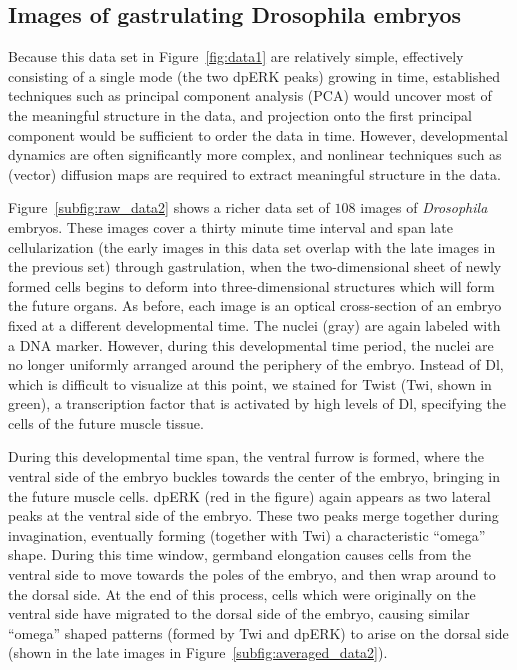\documentclass{pnastwo}
\begin{document}
\begin{article}
%

\subsection{Images of gastrulating  {\subsectionitfont Drosophila} embryos}

%
Because this data set in Figure~\ref{fig:data1} are relatively simple, effectively consisting of a single mode (the two dpERK peaks) growing in time,
established techniques such as principal component analysis (PCA) \cite{shlens2005tutorial} would uncover most of the meaningful structure in the data, and projection onto the first principal component would be sufficient to order the data in time.
%
However, developmental dynamics are often significantly more complex, and nonlinear techniques such as (vector) diffusion maps are required to extract meaningful structure in the data.
%

Figure~\ref{subfig:raw_data2} shows a richer data set of $108$ images of {\it Drosophila} embryos.
%
These images cover a thirty minute time interval and span late cellularization (the early images in this data set overlap with the late images in the previous set) through gastrulation, when the two-dimensional sheet of newly formed cells begins to deform into three-dimensional structures which will form the future organs.
%
As before, each image is an optical cross-section of an embryo fixed at a different developmental time.
%
The nuclei (gray) are again labeled with a DNA marker.
%
However, during this developmental time period, the nuclei are no longer uniformly arranged around the periphery of the embryo.
%
Instead of Dl, which is difficult to visualize at this point, we stained for Twist (Twi, shown in green), a transcription factor that is activated by high levels of Dl, specifying the cells of the future muscle tissue.
%

%
During this developmental time span, the ventral furrow is formed, where the ventral side of the embryo buckles towards the center of the embryo, bringing in the future muscle cells.
%
dpERK (red in the figure) again appears as two lateral peaks at the ventral side of the embryo.
%
These two peaks merge together during invagination, eventually forming (together with Twi) a characteristic ``omega'' shape.
%
During this time window, germband elongation causes cells from the ventral side to move towards the poles of the embryo, and then wrap around to the dorsal side.
%
At the end of this process, cells which were originally on the ventral side have migrated to the dorsal side of the embryo, causing similar ``omega'' shaped patterns (formed by Twi and dpERK) to arise on the dorsal side (shown in the late images in Figure~\ref{subfig:averaged_data2}).


\end{article}
\end{document}
